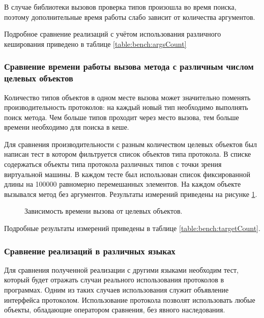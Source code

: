В случае библиотеки вызовов проверка типов произошла во время поиска, поэтому дополнительные время работы слабо зависит от количества аргументов.

Подробное сравнение реализаций с учётом использования различного кеширования приведено в таблице \ref{table:bench:argsCount}

\subsubsection{Сравнение времени работы вызова метода с различным числом целевых объектов}
Количество типов объектов в одном месте вызова может значительно поменять производительность протоколов: на каждый новый тип необходимо выполнять поиск метода. Чем больше типов проходит через место вызова, тем больше времени необходимо для поиска в кеше.

Для сравнения производительности с разным количеством целевых объектов был написан тест в котором фильтруется список объектов типа протокола. В списке содержаться объекты типа протокола различных типов с точки зрения виртуальной машины. В каждом тесте был использован список фиксированной длины на 100000 равномерно перемешанных элементов. На каждом объекте вызывался метод без аргументов. Результаты измерений приведены на рисунке \ref{plot:bench:targetCount}.
\begin{figure}
\caption{\label{plot:bench:targetCount}Зависимость времени вызова от целевых объектов.}
\end{figure}

Подробные результаты измерений приведены в таблице \ref{table:bench:targetCount}.

\subsubsection{Сравнение реализаций в различных языках}
Для сравнения полученной реализации с другими языками необходим тест, который будет отражать случаи реального использования протоколов в программах. Одним из таких случаев использования служит объявление интерфейса  протоколом. Использование протокола  позволят использовать любые объекты, обладающие оператором сравнения, без явного наследования.

